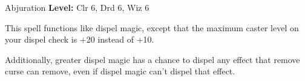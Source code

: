 {Abjuration}
{
	\textbf{Level:}
	Clr 6, Drd 6, Wiz 6\\
}
{
	This spell functions like dispel magic, except that the maximum caster level on your dispel check is +20 instead of +10.

	Additionally, greater dispel magic has a chance to dispel any effect that remove curse can remove, even if dispel magic can't dispel that effect.

}
